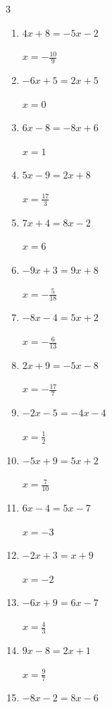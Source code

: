 \begin{multicols}{3}
\begin{enumerate}
  \item $4x+8=-5x-2$

        $\displaystyle x=-\frac{10}{9}$

  \item $-6x+5=2x+5$

        $\displaystyle x=0$

  \item $6x-8=-8x+6$

        $\displaystyle x=1$

  \item $5x-9=2x+8$

        $\displaystyle x=\frac{17}{3}$

  \item $7x+4=8x-2$

        $\displaystyle x=6$

  \item $-9x+3=9x+8$

        $\displaystyle x=-\frac{5}{18}$

  \item $-8x-4=5x+2$

        $\displaystyle x=-\frac{6}{13}$

  \item $2x+9=-5x-8$

        $\displaystyle x=-\frac{17}{7}$

  \item $-2x-5=-4x-4$

        $\displaystyle x=\frac{1}{2}$

  \item $-5x+9=5x+2$

        $\displaystyle x=\frac{7}{10}$

  \item $6x-4=5x-7$

        $\displaystyle x=-3$

  \item $-2x+3=x+9$

        $\displaystyle x=-2$

  \item $-6x+9=6x-7$

        $\displaystyle x=\frac{4}{3}$

\columnbreak %

  \item $9x-8=2x+1$

        $\displaystyle x=\frac{9}{7}$

  \item $-8x-2=8x-6$


\end{enumerate}
\end{multicols}
